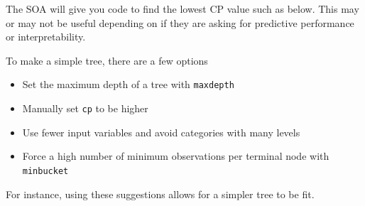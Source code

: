 \documentclass[openany]{book}
\newenvironment{Shaded}{\begin{snugshade}}{\end{snugshade}}
\newcommand{\DataTypeTok}[1]{\textcolor[rgb]{0.13,0.29,0.53}{#1}}
\newcommand{\DecValTok}[1]{\textcolor[rgb]{0.00,0.00,0.81}{#1}}
\newcommand{\FloatTok}[1]{\textcolor[rgb]{0.00,0.00,0.81}{#1}}
\newcommand{\KeywordTok}[1]{\textcolor[rgb]{0.13,0.29,0.53}{\textbf{#1}}}
\newcommand{\NormalTok}[1]{#1}
\newcommand{\OperatorTok}[1]{\textcolor[rgb]{0.81,0.36,0.00}{\textbf{#1}}}
\newcommand{\StringTok}[1]{\textcolor[rgb]{0.31,0.60,0.02}{#1}}
\providecommand{\tightlist}{%
  \setlength{\itemsep}{0pt}\setlength{\parskip}{0pt}}
\begin{document}
The SOA will give you code to find the lowest CP value such as below. This may or may not be useful depending on if they are asking for predictive performance or interpretability.

\begin{Shaded}
\end{Shaded}

To make a simple tree, there are a few options

\begin{itemize}
\tightlist
\item
  Set the maximum depth of a tree with \texttt{maxdepth}
\item
  Manually set \texttt{cp} to be higher
\item
  Use fewer input variables and avoid categories with many levels
\item
  Force a high number of minimum observations per terminal node with \texttt{minbucket}
\end{itemize}

For instance, using these suggestions allows for a simpler tree to be fit.

\begin{Shaded}
\end{Shaded}
\end{document}
